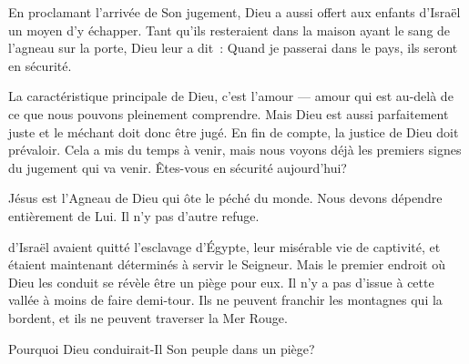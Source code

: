 En proclamant l'arrivée de Son jugement,
 Dieu a aussi offert aux enfants d'Israël un moyen d'y échapper.
 Tant qu'ils resteraient dans la maison ayant le sang de l'agneau sur la porte,
 Dieu leur a dit~:
 \og Quand je passerai dans le pays, ils seront en sécurité. \fg{}

La caractéristique principale de Dieu, c'est l'amour
 --- amour qui est au-delà de ce que nous pouvons pleinement comprendre.
 Mais Dieu est aussi parfaitement juste et le méchant doit donc être jugé.
 En fin de compte, la justice de Dieu doit prévaloir.
 Cela a mis du temps à venir, mais nous voyons déjà les premiers signes
 du jugement qui va venir.
 Êtes-vous en sécurité aujourd'hui?


Jésus est l'Agneau de Dieu qui ôte le péché du monde.
 Nous devons dépendre entièrement de Lui. Il n'y pas d'autre refuge. 

\dvrule






 d'Israël avaient quitté l'esclavage d'Égypte,
 leur misérable vie de captivité,
 et étaient maintenant déterminés à servir le Seigneur.
 Mais le premier endroit où Dieu les conduit se révèle être un piège pour eux.
 Il n'y a pas d'issue à cette vallée à moins de faire demi-tour.
 Ils ne peuvent franchir les montagnes qui la bordent,
 et ils ne peuvent traverser la Mer Rouge.

Pourquoi Dieu conduirait-Il Son peuple dans un piège?


